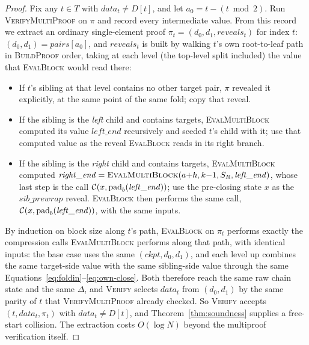 \begin{proof}
Fix any $t \in T$ with $\mathit{data}_t \ne D[t]$, and let $a_0 = t - (t
\bmod 2)$. Run \textsc{VerifyMultiProof} on $\pi$ and record every
intermediate value. From this record we extract an ordinary
single-element proof $\pi_t = (d_0, d_1, \mathit{reveals}_t)$ for index
$t$: $(d_0,d_1) = \mathit{pairs}[a_0]$, and $\mathit{reveals}_t$ is built
by walking $t$'s own root-to-leaf path in \textsc{BuildProof} order,
taking at each level (the top-level split included) the value that
\textsc{EvalBlock} would read there:
\begin{itemize}
\item If $t$'s sibling at that level contains no other target pair, $\pi$
  revealed it explicitly, at the same point of the same fold; copy that
  reveal.
\item If the sibling is the \emph{left} child and contains targets,
  \textsc{EvalMultiBlock} computed its value $\mathit{left\_end}$
  recursively and seeded $t$'s child with it; use that computed value as
  the reveal \textsc{EvalBlock} reads in its right branch.
\item If the sibling is the \emph{right} child and contains targets,
  \textsc{EvalMultiBlock} computed
  $\mathit{right\_end} = \textsc{EvalMultiBlock}(a{+}h, k{-}1, S_R,
  \mathit{left\_end})$, whose last step is the call $\mathcal{C}(x,
  \mathrm{pad}_b(\mathit{left\_end}))$; use the pre-closing state $x$ as
  the $\mathit{sib\_prewrap}$ reveal. \textsc{EvalBlock} then performs the
  same call, $\mathcal{C}(x, \mathrm{pad}_b(\mathit{left\_end}))$, with the same
  inputs.
\end{itemize}
By induction on block size along $t$'s path, \textsc{EvalBlock} on
$\pi_t$ performs exactly the compression calls \textsc{EvalMultiBlock}
performs along that path, with identical inputs: the base case uses the
same $(\mathit{ckpt}, d_0, d_1)$, and each level up combines the same
target-side value with the same sibling-side value through the same
Equations~\eqref{eq:foldin}--\eqref{eq:own-close}. Both therefore reach
the same raw chain state and the same $\Delta$, and \textsc{Verify}
selects $\mathit{data}_t$ from $(d_0,d_1)$ by the same parity of $t$ that
\textsc{VerifyMultiProof} already checked. So \textsc{Verify} accepts
$(t, \mathit{data}_t, \pi_t)$ with $\mathit{data}_t \ne D[t]$, and
Theorem~\ref{thm:soundness} supplies a free-start collision. The
extraction costs $O(\log N)$ beyond the multiproof verification itself.
\end{proof}

